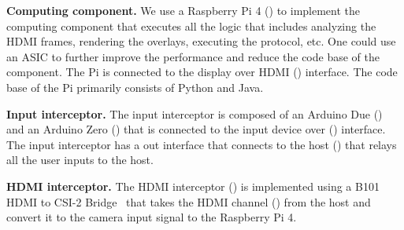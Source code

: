\begin{mylist}
 
  \item \textbf{Computing component.} We use a Raspberry Pi 4 (\six) to implement the computing component that executes all the \device logic that includes analyzing the HDMI frames, rendering the overlays, executing the \tls protocol, etc. One could use an ASIC to further improve the performance and reduce the code base of the component. The Pi is connected to the display over HDMI (\nine) interface. The code base of the Pi primarily consists of Python and Java.
  
  \item \textbf{Input interceptor.} The input interceptor is composed of an Arduino Due (\three) and an Arduino Zero (\four) that is connected to the input device over \usb (\two) interface. The input interceptor has a \usb out interface that connects to the host (\five) that relays all the user inputs to the host. 

  \item \textbf{HDMI interceptor.} The HDMI interceptor (\seven) is implemented using a B101 HDMI to CSI-2 Bridge~\cite{b101} that takes the HDMI channel (\eight) from the host and convert it to the camera input signal to the Raspberry Pi 4.  
 
\end{mylist}


